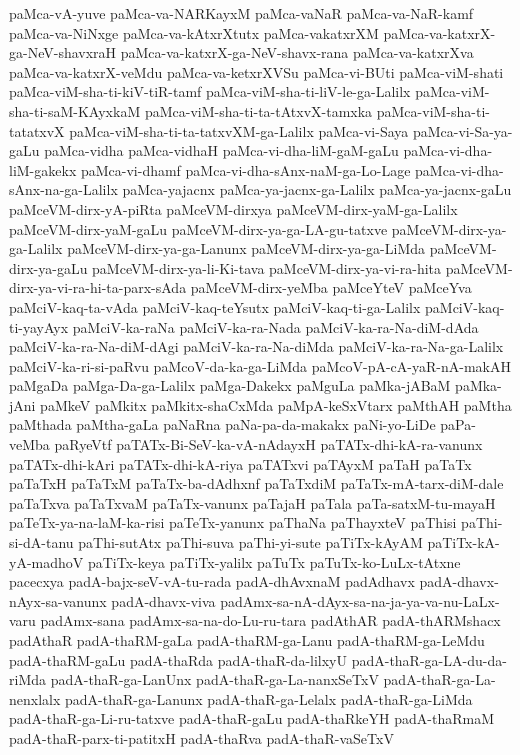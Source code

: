 {paMca-vA-yuve
paMca-va-NARKayxM
paMca-vaNaR
paMca-va-NaR-kamf
paMca-va-NiNxge
paMca-va-kAtxrXtutx
paMca-vakatxrXM
paMca-va-katxrX-ga-NeV-shavxraH
paMca-va-katxrX-ga-NeV-shavx-rana
paMca-va-katxrXva
paMca-va-katxrX-veMdu
paMca-va-ketxrXVSu
paMca-vi-BUti
paMca-viM-shati
paMca-viM-sha-ti-kiV-tiR-tamf
paMca-viM-sha-ti-liV-le-ga-Lalilx
paMca-viM-sha-ti-saM-KAyxkaM
paMca-viM-sha-ti-ta-tAtxvX-tamxka
paMca-viM-sha-ti-tatatxvX
paMca-viM-sha-ti-ta-tatxvXM-ga-Lalilx
paMca-vi-Saya
paMca-vi-Sa-ya-gaLu
paMca-vidha
paMca-vidhaH
paMca-vi-dha-liM-gaM-gaLu
paMca-vi-dha-liM-gakekx
paMca-vi-dhamf
paMca-vi-dha-sAnx-naM-ga-Lo-Lage
paMca-vi-dha-sAnx-na-ga-Lalilx
paMca-yajacnx
paMca-ya-jacnx-ga-Lalilx
paMca-ya-jacnx-gaLu
paMceVM-dirx-yA-piRta
paMceVM-dirxya
paMceVM-dirx-yaM-ga-Lalilx
paMceVM-dirx-yaM-gaLu
paMceVM-dirx-ya-ga-LA-gu-tatxve
paMceVM-dirx-ya-ga-Lalilx
paMceVM-dirx-ya-ga-Lanunx
paMceVM-dirx-ya-ga-LiMda
paMceVM-dirx-ya-gaLu
paMceVM-dirx-ya-li-Ki-tava
paMceVM-dirx-ya-vi-ra-hita
paMceVM-dirx-ya-vi-ra-hi-ta-parx-sAda
paMceVM-dirx-yeMba
paMceYteV
paMceYva
paMciV-kaq-ta-vAda
paMciV-kaq-teYsutx
paMciV-kaq-ti-ga-Lalilx
paMciV-kaq-ti-yayAyx
paMciV-ka-raNa
paMciV-ka-ra-Nada
paMciV-ka-ra-Na-diM-dAda
paMciV-ka-ra-Na-diM-dAgi
paMciV-ka-ra-Na-diMda
paMciV-ka-ra-Na-ga-Lalilx
paMciV-ka-ri-si-paRvu
paMcoV-da-ka-ga-LiMda
paMcoV-pA-cA-yaR-nA-makAH
paMgaDa
paMga-Da-ga-Lalilx
paMga-Dakekx
paMguLa
paMka-jABaM
paMka-jAni
paMkeV
paMkitx
paMkitx-shaCxMda
paMpA-keSxVtarx
paMthAH
paMtha
paMthada
paMtha-gaLa
paNaRna
paNa-pa-da-makakx
paNi-yo-LiDe
paPa-veMba
paRyeVtf
paTATx-Bi-SeV-ka-vA-nAdayxH
paTATx-dhi-kA-ra-vanunx
paTATx-dhi-kAri
paTATx-dhi-kA-riya
paTATxvi
paTAyxM
paTaH
paTaTx
paTaTxH
paTaTxM
paTaTx-ba-dAdhxnf
paTaTxdiM
paTaTx-mA-tarx-diM-dale
paTaTxva
paTaTxvaM
paTaTx-vanunx
paTajaH
paTala
paTa-satxM-tu-mayaH
paTeTx-ya-na-laM-ka-risi
paTeTx-yanunx
paThaNa
paThayxteV
paThisi
paThi-si-dA-tanu
paThi-sutAtx
paThi-suva
paThi-yi-sute
paTiTx-kAyAM
paTiTx-kA-yA-madhoV
paTiTx-keya
paTiTx-yalilx
paTuTx
paTuTx-ko-LuLx-tAtxne
pacecxya
padA-bajx-seV-vA-tu-rada
padA-dhAvxnaM
padAdhavx
padA-dhavx-nAyx-sa-vanunx
padA-dhavx-viva
padAmx-sa-nA-dAyx-sa-na-ja-ya-va-nu-LaLx-varu
padAmx-sana
padAmx-sa-na-do-Lu-ru-tara
padAthAR
padA-thARMshacx
padAthaR
padA-thaRM-gaLa
padA-thaRM-ga-Lanu
padA-thaRM-ga-LeMdu
padA-thaRM-gaLu
padA-thaRda
padA-thaR-da-lilxyU
padA-thaR-ga-LA-du-da-riMda
padA-thaR-ga-LanUnx
padA-thaR-ga-La-nanxSeTxV
padA-thaR-ga-La-nenxlalx
padA-thaR-ga-Lanunx
padA-thaR-ga-Lelalx
padA-thaR-ga-LiMda
padA-thaR-ga-Li-ru-tatxve
padA-thaR-gaLu
padA-thaRkeYH
padA-thaRmaM
padA-thaR-parx-ti-patitxH
padA-thaRva
padA-thaR-vaSeTxV
}
